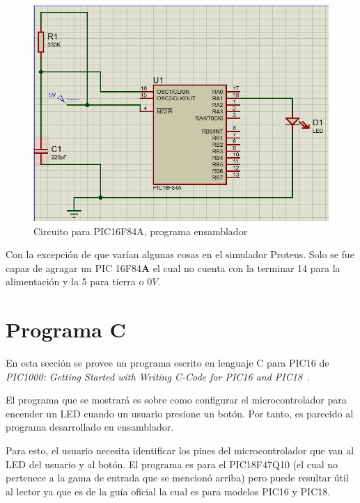 \documentclass[conference]{IEEEtran}
\begin{document}
    \begin{figure}[H]
        \centering
        \includegraphics[width=0.3\paperwidth]{images/pic16f84a-assembly-sim}
        \caption{Circuito para PIC16F84A, programa ensamblador}
    \end{figure}

    \bigbreak

    Con la excepción de que varían algunas cosas en el simulador Proteus.
    Solo se fue capaz de agragar un PIC 16F84\textbf{A} el cual no cuenta con
    la terminar 14 para la alimentación y la 5 para tierra o $0V$.

    \section{Programa C}

    En esta sección se provee un programa escrito en lenguaje C para PIC16 de
    \textit{PIC1000: Getting Started with Writing C-Code for PIC16 and PIC18}~\cite{microchip-c-program-2020}.

    \bigbreak

    El programa que se mostrará es sobre como configurar el microcontrolador
    para encender un LED cuando un usuario presione un botón. Por tanto, es
    parecido al programa desarrollado en ensamblador.

    \bigbreak

    Para esto, el usuario necesita identificar los pines del microcontrolador
    que van al LED del usuario y al botón. El programa es para el PIC18F47Q10
    (el cual no pertenece a la gama de entrada que se mencionó arriba) pero
    puede resultar útil al lector ya que es de la guía oficial la cual es
    para modelos PIC16 y PIC18.
\end{document}

